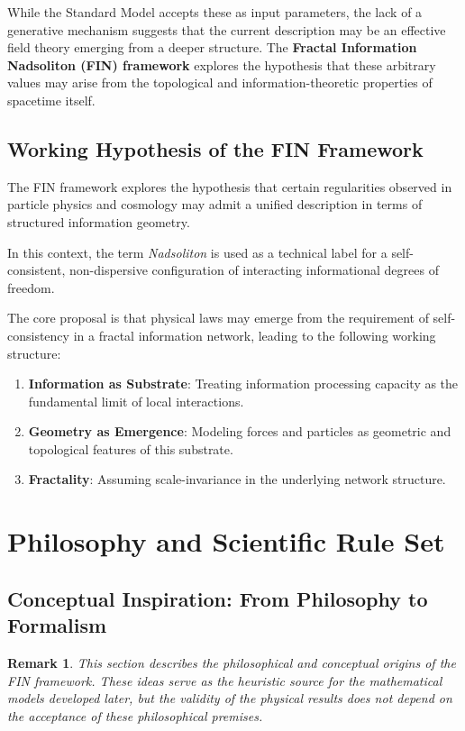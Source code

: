 \documentclass[11pt,a4paper]{article}
\newtheorem{remark}{Remark}
\begin{document}
While the Standard Model accepts these as input parameters, the lack of a generative mechanism suggests that the current description may be an effective field theory emerging from a deeper structure. The \textbf{Fractal Information Nadsoliton (FIN) framework} explores the hypothesis that these arbitrary values may arise from the topological and information-theoretic properties of spacetime itself.

\subsection{Working Hypothesis of the FIN Framework}
The FIN framework explores the hypothesis that certain regularities observed in particle physics and cosmology may admit a unified description in terms of structured information geometry.

In this context, the term \textit{Nadsoliton} is used as a technical label for a self-consistent, non-dispersive configuration of interacting informational degrees of freedom.

The core proposal is that physical laws may emerge from the requirement of self-consistency in a fractal information network, leading to the following working structure:
\begin{enumerate}[leftmargin=1.4em]
    \item \textbf{Information as Substrate}: Treating information processing capacity as the fundamental limit of local interactions.
    \item \textbf{Geometry as Emergence}: Modeling forces and particles as geometric and topological features of this substrate.
    \item \textbf{Fractality}: Assuming scale-invariance in the underlying network structure.
\end{enumerate}

\section{Philosophy and Scientific Rule Set}
\subsection{Conceptual Inspiration: From Philosophy to Formalism}
\begin{remark}
This section describes the \textit{philosophical and conceptual origins} of the FIN framework. These ideas serve as the heuristic source for the mathematical models developed later, but the validity of the physical results does not depend on the acceptance of these philosophical premises.
\end{remark}
\end{document}
